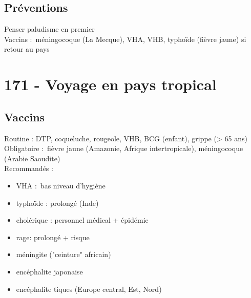 \subsection{Préventions}
\danger Penser paludisme en premier\\
Vaccins : méningocoque (La Mecque), {VHA, VHB, typhoïde (fièvre jaune)} si
retour au pays

\section{171 - Voyage en pays tropical}%
\subsection{Vaccins}%
Routine : DTP, coqueluche, rougeole, VHB, BCG (enfant), grippe (> 65 ans)\\
Obligatoire : fièvre jaune (Amazonie, Afrique intertropicale), méningocoque
(Arabie Saoudite)\\
Recommandés :
\begin{itemize}
  \item VHA : bas niveau d'hygiène
  \item typhoïde : prolongé (Inde)
  \item cholérique : personnel médical + épidémie
  \item rage: prolongé + risque
  \item méningite ("ceinture" africain)
  \item encéphalite japonaise
  \item encéphalite tiques (Europe central, Est, Nord)
\end{itemize}

